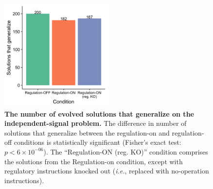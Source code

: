 \begin{figure}[ht]
    \centering
    \includegraphics[width=0.5\textwidth]{chapters/05-tag-based-genetic-regulation/media/chg-env-16-generalization.png}
    \caption{\small
    \textbf{The number of evolved solutions that generalize on the independent-signal problem.}
    The difference in number of solutions that generalize between the regulation-on and regulation-off conditions is statistically significant (Fisher's exact test: $p < 6\times10^{-06}$).
    The ``Regulation-ON (reg. KO)'' condition comprises the solutions from the Regulation-on condition, except with regulatory instructions knocked out (\textit{i.e.}, replaced with no-operation instructions).
    }
    \label{chapter:tag-based-regulation:fig:independent-signal-generalization}
\end{figure}


